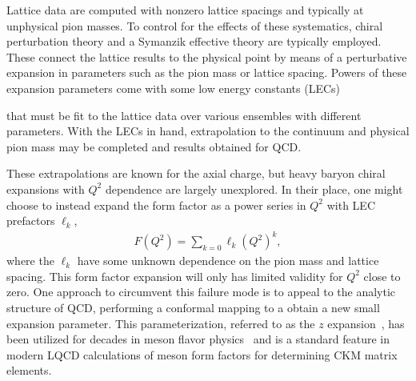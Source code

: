 
Lattice data are computed with nonzero lattice spacings and typically at unphysical pion masses.
To control for the effects of these systematics,
 chiral perturbation theory and a Symanzik effective theory are typically employed.
These connect the lattice results to the physical point by means
 of a perturbative expansion in parameters such as the pion mass or lattice spacing.
Powers of these expansion parameters come with some low energy constants (LECs)%
\begin{marginnote}
\end{marginnote}%
 that must be fit to the lattice data over various ensembles with different parameters.
With the LECs in hand, extrapolation to the continuum and physical pion mass
 may be completed and results obtained for QCD.

These extrapolations are known for the axial charge,
 but heavy baryon chiral expansions with $Q^2$ dependence are largely unexplored.
In their place, one might choose to instead expand the form factor as
 a power series in $Q^2$ with LEC prefactors $\ell_k$,
\begin{align}
 F(Q^2) = \sum_{k=0} \ell_k (Q^2)^k,
\end{align}
 where the $\ell_k$ have some unknown dependence on the pion mass and lattice spacing.
This form factor expansion will only has limited validity for $Q^2$ close to zero.
One approach to circumvent this failure mode is to appeal to the analytic structure of QCD,
 performing a conformal mapping to a obtain a new small expansion parameter.
This parameterization, referred to as the $z$ expansion~\cite{Bhattacharya:2011ah},
 has been utilized for decades in meson flavor physics~\cite{Okubo:1971jf}
 and is a standard feature in modern LQCD calculations of meson form factors
 for determining CKM matrix elements.


